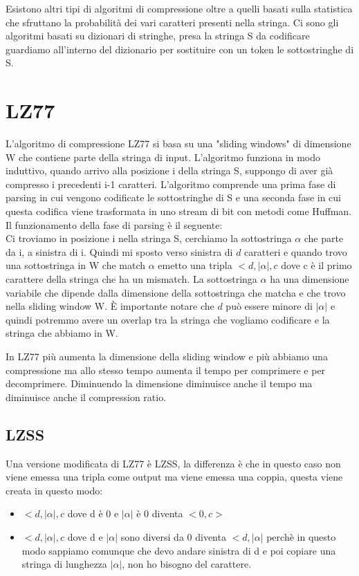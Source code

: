 \documentclass[14pt]{extreport}
\begin{document}
Esistono altri tipi di algoritmi di compressione oltre a quelli basati sulla statistica che sfruttano la probabilità dei vari caratteri presenti nella stringa. Ci sono gli algoritmi basati su dizionari di stringhe, presa la stringa S da codificare guardiamo all'interno del dizionario per sostituire con un token le sottostringhe di S.

\section{LZ77}

L'algoritmo di compressione LZ77 si basa su una "sliding windows" di dimensione W che contiene parte della stringa di input. L'algoritmo funziona in modo induttivo, quando arrivo alla posizione i della stringa S, suppongo di aver già compresso i precedenti i-1 caratteri.
L'algoritmo comprende una prima fase di parsing in cui vengono codificate le sottostringhe di S e una seconda fase in cui questa codifica viene trasformata in uno stream di bit con metodi come Huffman.
Il funzionamento della fase di parsing è il seguente: \\
Ci troviamo in posizione i nella stringa S, cerchiamo la sottostringa $\alpha$ che parte da i, a sinistra di i. 
Quindi mi sposto verso sinistra di $d$ caratteri e quando trovo una sottostringa in W che match $\alpha$ emetto una tripla $<d, |\alpha|, c$ dove c è il primo carattere della stringa che ha un mismatch.
La sottostringa $\alpha$ ha una dimensione variabile che dipende dalla dimensione della sottostringa che matcha e che trovo nella sliding window W.
È importante notare che $d$ può essere minore di $|\alpha|$ e quindi potremmo avere un overlap tra la stringa che vogliamo codificare e la stringa che abbiamo in W.

In LZ77 più aumenta la dimensione della sliding window e più abbiamo una compressione ma allo stesso tempo aumenta il tempo per comprimere e per decomprimere.
Diminuendo la dimensione diminuisce anche il tempo ma diminuisce anche il compression ratio.

\subsection{LZSS}

Una versione modificata di LZ77 è LZSS, la differenza è che in questo caso non viene emessa una tripla come output ma viene emessa una coppia, questa viene creata in questo modo:
\begin{itemize}
\item $<d, |\alpha|, c$ dove d è 0 e $|\alpha|$ è 0 diventa $<0,c>$
\item $<d, |\alpha|, c$ dove d e $|\alpha|$ sono diversi da 0 diventa $<d, |\alpha|$ perchè in questo modo sappiamo comunque che devo andare  sinistra di d e poi copiare una stringa di lunghezza $|\alpha|$, non ho bisogno del carattere.
\end{itemize}
\end{document}
